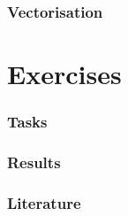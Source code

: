 \documentclass[9pt,xcolor=table]{beamer}
\begin{document}
\section{Vectorisation}


\part{Exercises}
\section{Tasks}
\section{Results}

\section{Literature}
\begin{frame}[c]
\frametitle{\insertsection{}}
\nocite{*}
\tiny%


\end{frame}
\end{document}

